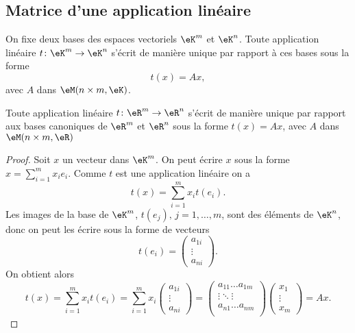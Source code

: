 \subsection{Matrice d'une application linéaire}

\begin{proposition}     \label{PROPooCESFooGOZBNI}
 On fixe deux bases des espaces vectoriels \( \eK^m \) et \( \eK^n \).
 Toute application linéaire \( t\colon \eK^m\to \eK^n\) s'écrit de manière unique par rapport à ces bases sous la forme
\[
t(x)=Ax,
\]
avec $A$ dans $\eM(n\times m, \eK)$.
\end{proposition}

\begin{corollary}
Toute application linéaire \( t\colon \eR^m\to \eR^n\) s'écrit de manière unique par rapport aux bases canoniques de $\eR^m$ et $\eR^n$ sous la forme
\( t(x)=Ax \), avec $A$ dans $\eM(n\times m, \eR)$
\end{corollary}

\begin{proof}
  Soit $x$ un vecteur dans $\eK^m$. On peut écrire $x$ sous la forme $ x=\sum_{i=1}^{m}x_i e_i$. Comme $t$ est une application linéaire on a
\[
t(x)=\sum_{i=1}^{m}x_it(e_i).
\]
Les images de la base de $\eK^m$, $t(e_j), \, j=1,\ldots,m$, sont des éléments de $\eK^n$, donc on peut les écrire sous la forme de vecteurs
\[
t(e_i)=
\begin{pmatrix}
  a_{1i}\\
\vdots\\
a_{ni}
\end{pmatrix}.
\]
On obtient alors
\[
t(x)=\sum_{i=1}^{m}x_it(e_i)=\sum_{i=1}^{m}x_i\begin{pmatrix}
  a_{1i}\\
\vdots\\
a_{ni}
\end{pmatrix}=
\begin{pmatrix}
  a_{11} \ldots a_{1m}\\
\vdots \ddots \vdots\\
 a_{n1} \ldots a_{nm}\\
\end{pmatrix}
\begin{pmatrix}
  x_1\\
\vdots\\
x_m
\end{pmatrix}=Ax.
\]
\end{proof}

